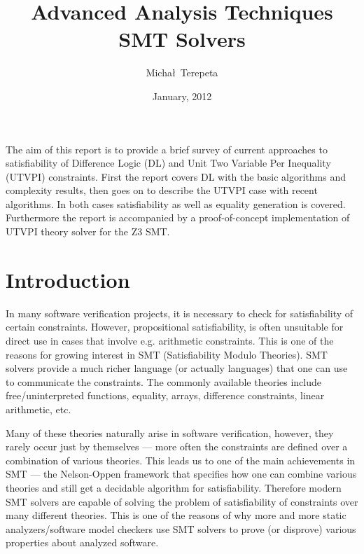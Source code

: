 \documentclass[a4paper,10pt]{article}
\begin{document}
\pagestyle{headings}

\title{Advanced Analysis Techniques \\ SMT Solvers}
\author{Micha\l\ Terepeta}

\date{January, 2012}

\maketitle

{\abstract The aim of this report is to provide a brief survey of current
approaches to satisfiability of Difference Logic (DL) and Unit Two Variable Per
Inequality (UTVPI) constraints. First the report covers DL with the basic
algorithms and complexity results, then goes on to describe the UTVPI case with
recent algorithms. In both cases satisfiability as well as equality generation
is covered. Furthermore the report is accompanied by a proof-of-concept
implementation of UTVPI theory solver for the Z3 SMT.}


\tableofcontents

\newpage
\section{Introduction}

In many software verification projects, it is necessary to check for
satisfiability of certain constraints. However, propositional satisfiability,
is often unsuitable for direct use in cases that involve e.g. arithmetic
constraints. This is one of the reasons for growing interest in SMT
(Satisfiability Modulo Theories). SMT solvers provide a much richer
language (or actually languages) that one can use to communicate the
constraints. The commonly available theories include free/uninterpreted
functions, equality, arrays, difference constraints, linear arithmetic, etc.

Many of these theories naturally arise in software verification, however, they
rarely occur just by themselves --- more often the constraints are defined over a
combination of various theories. This leads us to one of the main achievements
in SMT --- the Nelson-Oppen framework \cite{bib:nelson_oppen} that specifies how
one can combine various theories and still get a decidable algorithm for
satisfiability. Therefore modern SMT solvers are capable of solving the problem
of satisfiability of constraints over many different theories. This is one of
the reasons of why more and more static analyzers/software model checkers use
SMT solvers to prove (or disprove) various properties about analyzed software.
\end{document}
